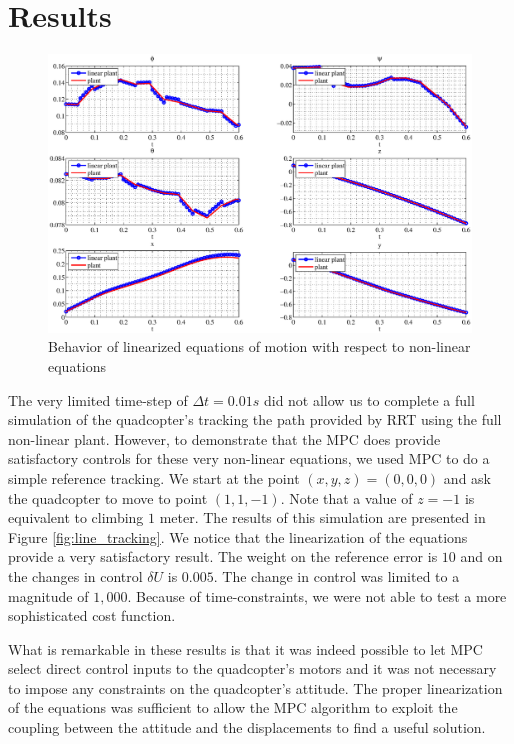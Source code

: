 \section{Results \label{ref:results}}
\begin{figure}[]
\centering
\includegraphics[width=20cm]{linearization.eps}
\caption{Behavior of linearized equations of motion with respect to non-linear equations}
\label{fig:linearization}
\end{figure}

The very limited time-step of $\Delta t = 0.01s$ did not allow us to complete a full simulation of the quadcopter's tracking the path provided by RRT using the full non-linear plant. However, to demonstrate that the MPC does provide satisfactory controls for these very non-linear equations, we used MPC to do a simple reference tracking. We start at the point $(x,y,z) = (0,0,0)$ and ask the quadcopter to move to point $(1,1,-1)$. Note that a value of $z=-1$ is equivalent to climbing $1$ meter. The results of this simulation are presented in Figure \eqref{fig:line_tracking}. We notice that the linearization of the equations provide a very satisfactory result. The weight on the reference error is $10$ and on the changes in control $\delta U$ is $0.005$. The change in control was limited to a magnitude of $1,000$. Because of time-constraints, we were not able to test a more sophisticated cost function.

What is remarkable in these results is that it was indeed possible to let MPC select direct control inputs to the quadcopter's motors and it was not necessary to impose any constraints on the quadcopter's attitude. The proper linearization of the equations was sufficient to allow the MPC algorithm to exploit the coupling between the attitude and the displacements to find a useful solution.


